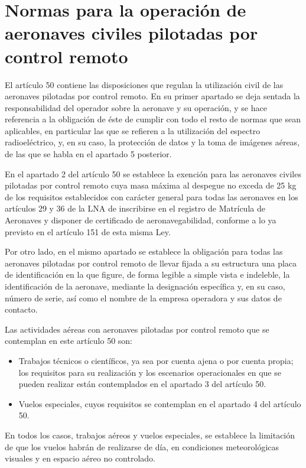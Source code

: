 \section{Normas para la operación de aeronaves civiles pilotadas por control remoto}

El artículo 50 contiene las disposiciones que regulan la utilización civil de las aeronaves pilotadas por control remoto. En su primer apartado se deja sentada la responsabilidad del operador sobre la aeronave y su operación, y se hace referencia a la obligación de éste de cumplir con todo el resto de normas que sean aplicables, en particular las que se refieren a la utilización del espectro radioeléctrico, y, en su caso, la protección de datos y la toma de imágenes aéreas, de las que se habla en el apartado 5 posterior.

En el apartado 2 del artículo 50 se establece la exención para las aeronaves civiles pilotadas por control remoto cuya masa máxima al despegue no exceda de 25 kg de los requisitos establecidos con carácter general para todas las aeronaves en los artículos 29 y 36 de la \acs{LNA} de inscribirse en el registro de Matrícula de Aeronaves y disponer de certificado de aeronavegabilidad, conforme a lo ya previsto en el artículo 151 de esta misma Ley.

Por otro lado, en el mismo apartado se establece la obligación para todas las aeronaves pilotadas por control remoto de llevar fijada a su estructura una placa de identificación en la que figure, de forma legible a simple vista e indeleble, la identificación de la aeronave, mediante la designación específica y, en su caso, número de serie, así como el nombre de la empresa operadora y sus datos de contacto.

Las actividades aéreas con aeronaves pilotadas por control remoto que se contemplan en este artículo 50 son:

\begin{itemize}
\item Trabajos técnicos o científicos, ya sea por cuenta ajena o por cuenta propia; los requisitos para su realización y los escenarios operacionales en que se pueden realizar están contemplados en el apartado 3 del artículo 50.
\item Vuelos especiales, cuyos requisitos se contemplan en el apartado 4 del artículo 50.
\end{itemize}

En todos los casos, trabajos aéreos y vuelos especiales, se establece la limitación de que los vuelos habrán de realizarse de día, en condiciones meteorológicas visuales y en espacio aéreo no controlado.

